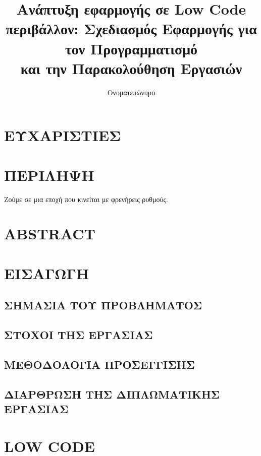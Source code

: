 \documentclass{template}
\title{Ανάπτυξη εφαρμογής σε Low Code περιβάλλον: Σχεδιασμός Εφαρμογής για τον Προγραμματισμό \\
	και την Παρακολούθηση Εργασιών}
\author{Ονοματεπώνυμο}
\begin{document}
\maketitle

\frontmatter



	\chapter{ΕΥΧΑΡΙΣΤΙΕΣ}
	\newpage

	\chapter{ΠΕΡΙΛΗΨΗ}
	Ζούμε σε μια εποχή που κινείται με φρενήρεις ρυθμούς.
	\newpage

	\chapter{ABSTRACT}
	\newpage


	\tableofcontents
	\listoffigures
	\listoftables


\mainmatter

%
%
%
%
    \chapter{ΕΙΣΑΓΩΓΗ}

    \section{ΣΗΜΑΣΙΑ ΤΟΥ ΠΡΟΒΛΗΜΑΤΟΣ}
    \section{ΣΤΟΧΟΙ ΤΗΣ ΕΡΓΑΣΙΑΣ}
    \section{ΜΕΘΟΔΟΛΟΓΙΑ ΠΡΟΣΕΓΓΙΣΗΣ}
    \section{ΔΙΑΡΘΡΩΣΗ ΤΗΣ ΔΙΠΛΩΜΑΤΙΚΗΣ ΕΡΓΑΣΙΑΣ}

    \chapter{LOW CODE}
\end{document}
